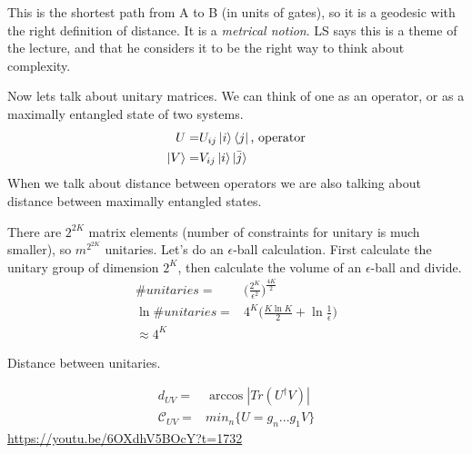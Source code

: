 \documentclass[]{article}
\begin{document}
This is the shortest path from A to B (in units of gates), so it is a geodesic with the right definition of distance. It is a \emph{metrical notion}. LS says this is a theme of the lecture, and that he considers it to be the right way to think about complexity.
 


Now lets talk about unitary matrices. We can think of one as an operator, or as a maximally entangled state of two systems.
\begin{align*}
	U =& U_{ij}\ket{i}\bra{j} \text{, operator}\\
	\ket{V} =& V_{ij}\ket{i} \ket{\bar{j}}
\end{align*}
When we talk about distance between operators we are also talking about distance between maximally entangled states.

There are $2^{2K}$ matrix elements (number of constraints for unitary is much smaller), so $m^{2^{2K}}$ unitaries. Let's do an $\epsilon$-ball calculation. First calculate the unitary group of dimension $2^K$, then calculate the volume of an $\epsilon$-ball and divide.
\begin{align*}
	\#unitaries =& \bigg(\frac{2^K}{\epsilon^2}\bigg)^\frac{4K}{2}\\
	\ln \#unitaries =& 4^K\bigg(\frac{K \ln K}{2} + \ln\frac{1}{\epsilon}\bigg)\\
	\approx 4^K
\end{align*}

Distance between unitaries.

\begin{align*}
	d_{UV}=& \arccos \left|Tr(U^\dagger V)\right|\\
	\mathcal{C}_{UV}=& min_n \{U=g_n...g_1V\}
\end{align*}
\url{https://youtu.be/6OXdhV5BOcY?t=1732}


\raggedright

\end{document}

